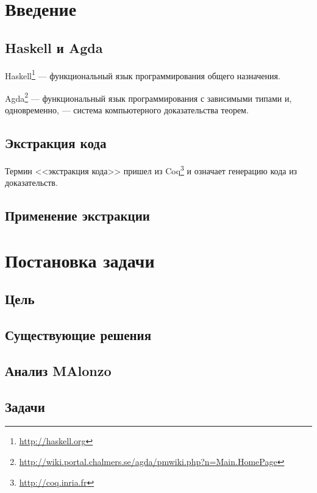 \section{Введение}

\subsection{Haskell и Agda}

Haskell\footnote{\url{http://haskell.org}} --- функциональный язык программирования
общего назначения.

Agda\footnote{\url{http://wiki.portal.chalmers.se/agda/pmwiki.php?n=Main.HomePage}} ---
функциональный язык программирования с зависимыми типами и, одновременно, ---
система компьютерного доказательства теорем.

\subsection{Экстракция кода}

Термин <<экстракция кода>> пришел из Coq\footnote{\url{http://coq.inria.fr}}
и означает генерацию кода из доказательств\cite{Let02}.

\subsection{Применение экстракции}

\newpage
\section{Постановка задачи}

\subsection{Цель}

\subsection{Существующие решения}

\subsection{Анализ MAlonzo}

\subsection{Задачи}


